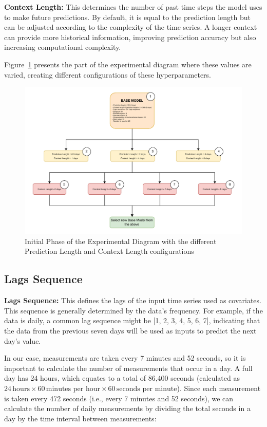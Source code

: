 \noindent\textbf{Context Length:} This determines the number of past time steps the model uses to make future predictions. By default, it is equal to the prediction length but can be adjusted according to the complexity of the time series. A longer context can provide more historical information, improving prediction accuracy but also increasing computational complexity.

Figure~\ref{D1} presents the part of the experimental diagram where these values are varied, creating different configurations of these hyperparameters.

\begin{figure}[htbp]
    \centering
    \includegraphics[width=15 cm]{5_ChapterDesign/figuras/Diagrams/D1.pdf}
    \caption{Initial Phase of the Experimental Diagram with the different Prediction Length and Context Length configurations}
    \label{D1}
\end{figure}



\subsection{Lags Sequence}

\textbf{Lags Sequence:} This defines the lags of the input time series used as covariates. This sequence is generally determined by the data's frequency. For example, if the data is daily, a common lag sequence might be [1, 2, 3, 4, 5, 6, 7], indicating that the data from the previous seven days will be used as inputs to predict the next day's value.

In our case, measurements are taken every 7 minutes and 52 seconds, so it is important to calculate the number of measurements that occur in a day. A full day has 24 hours, which equates to a total of 86,400 seconds (calculated as \(24 \, \text{hours} \times 60 \, \text{minutes per hour} \times 60 \, \text{seconds per minute}\)). Since each measurement is taken every 472 seconds (i.e., every 7 minutes and 52 seconds), we can calculate the number of daily measurements by dividing the total seconds in a day by the time interval between measurements: 

